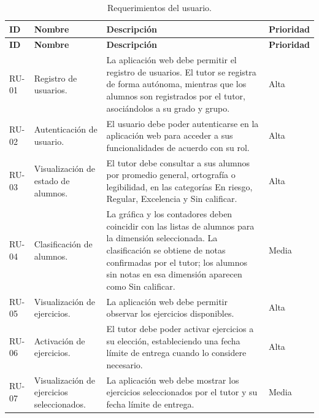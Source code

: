 \begin{longtable}{|>{\centering\arraybackslash}m{2cm}|m{3.6cm}|
  Y{\dimexpr\textwidth-7.6cm-8\arrayrulewidth\relax}|
  >{\centering\arraybackslash}m{2cm}|}
\caption{Requerimientos del usuario.}
\label{tab:ru} \\

\hline
\textbf{ID} & \textbf{Nombre} & \textbf{Descripción} & \textbf{Prioridad} \\
\hline
\endfirsthead

\hline
\textbf{ID} & \textbf{Nombre} & \textbf{Descripción} & \textbf{Prioridad} \\
\hline
\endhead

\hline
\endfoot
\endlastfoot

RU-01 &
Registro de usuarios. &
La aplicación web debe permitir el registro de usuarios. El tutor se registra de forma autónoma, mientras que los alumnos son registrados por el tutor, asociándolos a su grado y grupo. &
Alta \\
\hline

RU-02 &
Autenticación de usuario. &
El usuario debe poder autenticarse en la aplicación web para acceder a sus funcionalidades de acuerdo con su rol. &
Alta \\
\hline

RU-03 &
Visualización de estado de alumnos. &
El tutor debe consultar a sus alumnos por promedio general, ortografía o legibilidad, en las categorías En riesgo, Regular, Excelencia y Sin calificar. &
Alta \\
\hline

RU-04 &
Clasificación de alumnos. &
La gráfica y los contadores deben coincidir con las listas de alumnos para la dimensión seleccionada. La clasificación se obtiene de notas confirmadas por el tutor; los alumnos sin notas en esa dimensión aparecen como Sin calificar. &
Media \\
\hline

RU-05 &
Visualización de ejercicios. &
La aplicación web debe permitir observar los ejercicios disponibles. &
Alta \\
\hline

RU-06 &
Activación de ejercicios. &
El tutor debe poder activar ejercicios a su elección, estableciendo una fecha límite de entrega cuando lo considere necesario. &
Alta \\
\hline

RU-07 &
Visualización de ejercicios seleccionados. &
La aplicación web debe mostrar los ejercicios seleccionados por el tutor y su fecha límite de entrega. &
Media \\
\hline


\end{longtable}
